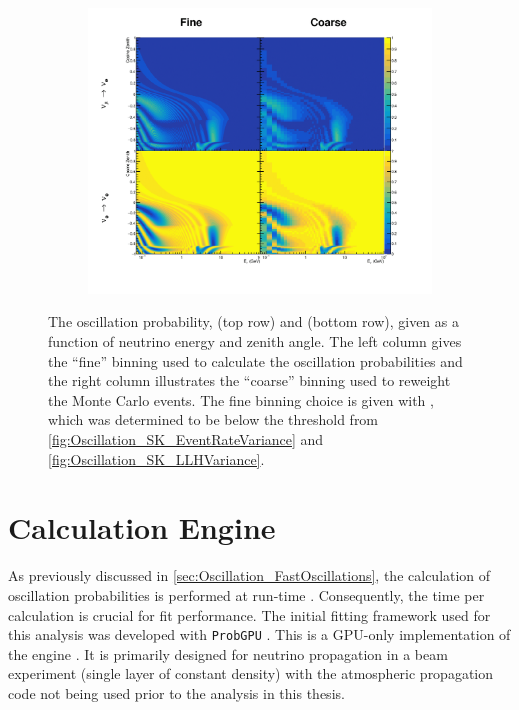 \begin{figure}[h]
  \begin{subfigure}[t]{\textwidth}
    \includegraphics[width=\textwidth, trim={0mm 0mm 0mm 0mm}, clip,page=1]{Figures/Oscillation/SmearingImplementation.pdf}
  \end{subfigure}
  \caption{The oscillation probability,  (top row) and  (bottom row), given as a function of neutrino energy and zenith angle. The left column gives the ``fine'' binning used to calculate the oscillation probabilities and the right column illustrates the ``coarse'' binning used to reweight the Monte Carlo events. The fine binning choice is given with , which was determined to be below the threshold from \autoref{fig:Oscillation_SK_EventRateVariance} and \autoref{fig:Oscillation_SK_LLHVariance}.}
  \label{fig:Oscillation_SK_SmearingImplementation}
\end{figure}

\section{Calculation Engine}
\label{sec:Oscillation_CalculationEngine}

As previously discussed in \autoref{sec:Oscillation_FastOscillations}, the calculation of oscillation probabilities is performed at run-time . Consequently, the time per calculation is crucial for fit performance. The initial fitting framework used for this analysis was developed with \texttt{ProbGPU} \cite{probgpu}. This is a GPU-only implementation of the  engine \cite{Prob3}. It is primarily designed for neutrino propagation in a beam experiment (single layer of constant density) with the atmospheric propagation code not being used prior to the analysis in this thesis.

